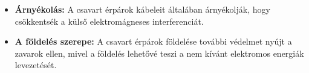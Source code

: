 \documentclass[11pt,a4paper]{article}
\begin{document}
\begin{tcolorbox}[colback=blue!5!white,colframe=blue!50!black,title= 41. Ismertesse az ethernet hálózaton használt eszközöket!]
\begin{itemize}
                                            \item \textbf{Árnyékolás:} A csavart érpárok kábeleit általában árnyékolják, hogy csökkentsék a külső elektromágneses interferenciát.
                                            \item \textbf{A földelés szerepe:} A csavart érpárok földelése további védelmet nyújt a zavarok ellen, mivel a földelés lehetővé teszi a nem kívánt elektromos energiák levezetését.
                                        \end{itemize}
                                        \begin{center}
                                        \end{center}
                                        
            \end{tcolorbox}
            
\end{document}

